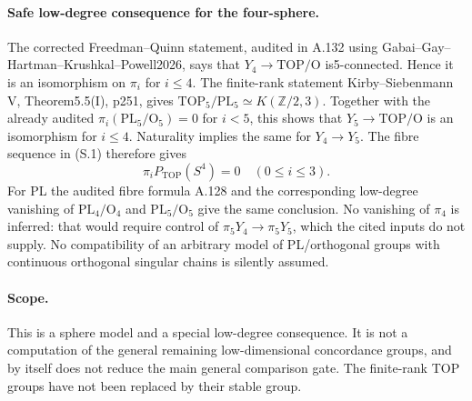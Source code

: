 \paragraph{Safe low-degree consequence for the four-sphere.}
The corrected Freedman--Quinn statement, audited in A.132 using
Gabai--Gay--Hartman--Krushkal--Powell2026, says that
$Y_4\to\mathrm{TOP}/\mathrm O$ is5-connected. Hence it is an
isomorphism on $\pi_i$ for $i\le4$. The finite-rank statement
Kirby--Siebenmann V, Theorem5.5(I), p251, gives
$\mathrm{TOP}_5/\mathrm{PL}_5\simeq K(\mathbb Z/2,3)$.
Together with the already audited
$\pi_i(\mathrm{PL}_5/\mathrm O_5)=0$ for $i<5$, this shows that
$Y_5\to\mathrm{TOP}/\mathrm O$ is an isomorphism for $i\le4$.
Naturality implies the same for $Y_4\to Y_5$.
The fibre sequence in (S.1) therefore gives
\[
                \pi_iP_{\mathrm{TOP}}(S^4)=0
                           \quad(0\le i\le3).         \tag{S.12}
\]
For PL the audited fibre formula A.128 and the corresponding
low-degree vanishing of $\mathrm{PL}_4/\mathrm O_4$ and
$\mathrm{PL}_5/\mathrm O_5$ give the same conclusion.
No vanishing of $\pi_4$ is inferred: that would require control
of $\pi_5Y_4\to\pi_5Y_5$, which the cited inputs do not supply.
No compatibility of an arbitrary model of PL/orthogonal groups
with continuous orthogonal singular chains is silently assumed.

\paragraph{Scope.}
This is a sphere model and a special low-degree consequence. It is
not a computation of the general remaining low-dimensional
concordance groups, and by itself does not reduce the main general
comparison gate. The finite-rank TOP groups have not been replaced
by their stable group.
